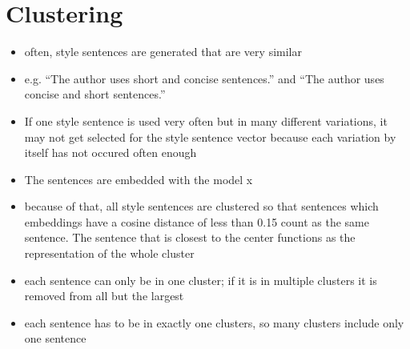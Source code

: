 \section{Clustering}
\label{sec:approach:clustering}

\begin{itemize}
  \item often, style sentences are generated that are very similar
  \item e.g. \enquote{The author uses short and concise sentences.} and \enquote{The author uses concise and short sentences.}
  \item If one style sentence is used very often but in many different variations, it may not get selected for the style sentence vector because each variation by itself has not occured often enough
  \item The sentences are embedded with the model x %
  \item because of that, all style sentences are clustered so that sentences which embeddings have a cosine distance of less than 0.15 count as the same sentence. The sentence that is closest to the center functions as the representation of the whole cluster
  \item each sentence can only be in one cluster; if it is in multiple clusters it is removed from all but the largest
  \item each sentence has to be in exactly one clusters, so many clusters include only one sentence
\end{itemize}
